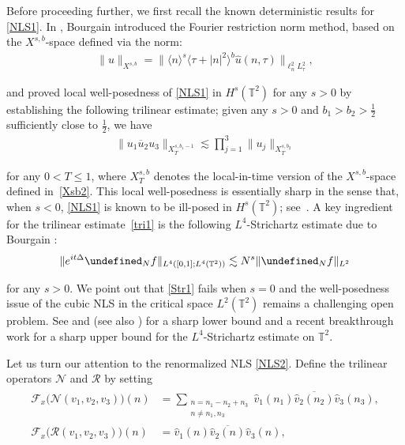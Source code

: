 \documentclass[%
11pt,  reqno]{amsart}
\newcommand{\1}{\hspace{0.2mm}\text{I}\hspace{0.2mm}}
\newcommand{\noi}{\noindent}
\newcommand{\T}{\mathbb{T}}
\let\P= \undefined
\newcommand{\P}{\mathbf{P}}
\newcommand{\F}{\mathcal{F}}
\newcommand{\Dl}{\Delta}
\newcommand{\ft}{\widehat}
\newcommand{\cj}{\overline}
\renewcommand{\l}{\ell}
\newcommand{\les}{\lesssim}
\newcommand{\jb}[1]
{\langle #1 \rangle}
\newcommand{\NN}{\mathcal{N}}
\newcommand{\RR}{\mathcal{R}}
\numberwithin{equation}{section}
\numberwithin{theorem}{section}
\begin{document}
Before proceeding further, 
we first recall  the known deterministic results
for \eqref{NLS1}.
In \cite{BO93}, Bourgain introduced the Fourier restriction norm method, 
based on the $X^{s, b}$-space defined via the norm:
\begin{align}
\| u \|_{X^{s, b}} = \|\jb{n}^s\jb{\tau +|n|^2}^b \ft u(n, \tau)\|_{\l^2_n L^2_\tau}, 
\label{Xsb}
\end{align}


\noi
and 
proved local well-posedness of \eqref{NLS1}
in $H^s(\T^2)$ for any $s > 0$
by establishing  the following trilinear estimate;
given 
any $s > 0$ and
$b_1 > b_2 > \frac 12$ sufficiently close to $\frac 12$, 
we have 
\begin{align}
\|u_1 \cj u_2 u_3\|_{X^{s, b_1-1}_T} \les  \prod_{j = 1}^3 \|u_j\|_{X^{s, b_2}_T}
\label{tri1}
\end{align}

\noi
for any  $0 < T \le 1$, 
where $X^{s, b}_T$ denotes the local-in-time version of the $X^{s, b}$-space
defined in~\eqref{Xsb2}.
This local well-posedness is essentially sharp
in the sense that, 
when $s < 0$, 
\eqref{NLS1} is known to be ill-posed in $H^s(\T^2)$; 
see~\cite{Oh17}.
A key ingredient for the trilinear estimate~\eqref{tri1}
is the following 
$L^4$-Strichartz estimate %
due to Bourgain \cite{BO93}:
\begin{align}
\| e^{it \Dl}  \P_N f\|_{L^4([0, 1]; L^4(\T^2))} \les N^s \|\P_N f\|_{L^2}
\label{Str1}
\end{align}

\noi
for any $s> 0$.
 We point out that  \eqref{Str1}
fails when $s = 0$ and 
the well-posedness issue of the cubic NLS
in the critical space $L^2(\T^2)$ remains
a challenging open problem.
See \cite[Remark~4.3]{Oh13} and \cite[Section~3]{Kishimoto}
(see also \cite{TTz})
for a sharp lower bound
and  a recent breakthrough work \cite{HK24} for a sharp upper bound
for the $L^4$-Strichartz estimate on $\T^2$.



Let us turn our attention to the renormalized NLS \eqref{NLS2}.
Define the trilinear operators
$\NN$ and $\RR$
by setting
\begin{align}
\begin{split}
\F_x\big(\NN(v_1,v_2,v_3)\big)(n) 
& = \sum_{\substack{n = n_1 - n_2 + n_3\\ n\neq n_{1},n_{3}}}
\ft v_1 (n_1) \cj{\ft v_2 (n_2)} \ft v_3 (n_3), \\
\F_x\big(\RR(v_1,v_2,v_3)\big) (n) 
& = 
\ft v_1 (n) \cj{\ft v_2 (n)} \ft v_3 (n), 
\end{split}
\label{non1}
\end{align}
\end{document}
